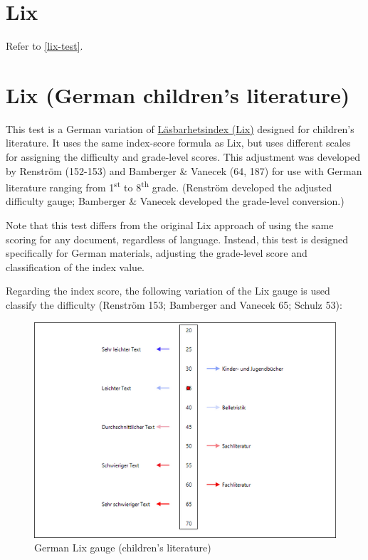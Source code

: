 \documentclass[
]{book}
\theoremstyle{definition}
\theoremstyle{definition}
\theoremstyle{definition}
\theoremstyle{definition}
\theoremstyle{remark}
\begin{document}
\newpage

\hypertarget{lix-german}{%
\section{Lix}\label{lix-german}}

Refer to \ref{lix-test}.

\hypertarget{lix-german-childrens-literature}{%
\section{\texorpdfstring{Lix (German children's literature)}{Lix (German children's literature)}}\label{lix-german-childrens-literature}}

This test is a German variation of \protect\hyperlink{lix-test}{Läsbarhetsindex (Lix)} designed for children's literature. It uses the same index-score formula as Lix, but uses different scales for assigning the difficulty and grade-level scores. This adjustment was developed by Renström (152-153) and Bamberger \& Vanecek (64, 187) for use with German literature ranging from 1\textsuperscript{st} to 8\textsuperscript{th} grade. (Renström developed the adjusted difficulty gauge; Bamberger \& Vanecek developed the grade-level conversion.)

Note that this test differs from the original Lix approach of using the same scoring for any document, regardless of language. Instead, this test is designed specifically for German materials, adjusting the grade-level score and classification of the index value.

Regarding the index score, the following variation of the Lix gauge is used classify the difficulty (Renström 153; Bamberger and Vanecek 65; Schulz 53):

\begin{figure}[H]

{\centering \includegraphics[width=0.75\linewidth,]{Images/GermanLixGauge} 

}

\caption{German Lix gauge (children's literature)}\label{fig:germanLix}
\end{figure}
\end{document}
